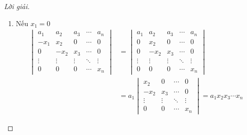 \begin{proof}[Lời giải]
\begin{enumerate}[label = (\alph*)]
\begin{align*}
\begin{vmatrix}
                      0                   & 0                   & 0                   & \cdots & x
                  \end{vmatrix}
                  = \left(\sum^{n}_{k=0}a_{k}\right)x^{n}.
              \end{align*}
              \endgroup{}
        \item Nếu $x_{1} = 0$
              \begin{align*}
                  \begin{vmatrix}
                      a_{1}  & a_{2}  & a_{3}  & \cdots & a_{n}  \\
                      -x_{1} & x_{2}  & 0      & \cdots & 0      \\
                      0      & -x_{2} & x_{3}  & \cdots & 0      \\
                      \vdots & \vdots & \vdots & \ddots & \vdots \\
                      0      & 0      & 0      & \cdots & x_{n}
                  \end{vmatrix}
                   & =
                  \begin{vmatrix}
                      a_{1}  & a_{2}  & a_{3}  & \cdots & a_{n}  \\
                      0      & x_{2}  & 0      & \cdots & 0      \\
                      0      & -x_{2} & x_{3}  & \cdots & 0      \\
                      \vdots & \vdots & \vdots & \ddots & \vdots \\
                      0      & 0      & 0      & \cdots & x_{n}
                  \end{vmatrix}             \\
                   & = a_{1} \begin{vmatrix}
                                 x_{2}  & 0      & \cdots & 0      \\
                                 -x_{2} & x_{3}  & \cdots & 0      \\
                                 \vdots & \vdots & \ddots & \vdots \\
                                 0      & 0      & \cdots & x_{n}
                             \end{vmatrix} = a_{1}x_{2}x_{3}\cdots x_{n}
              \end{align*}


\end{enumerate}
\end{proof}
